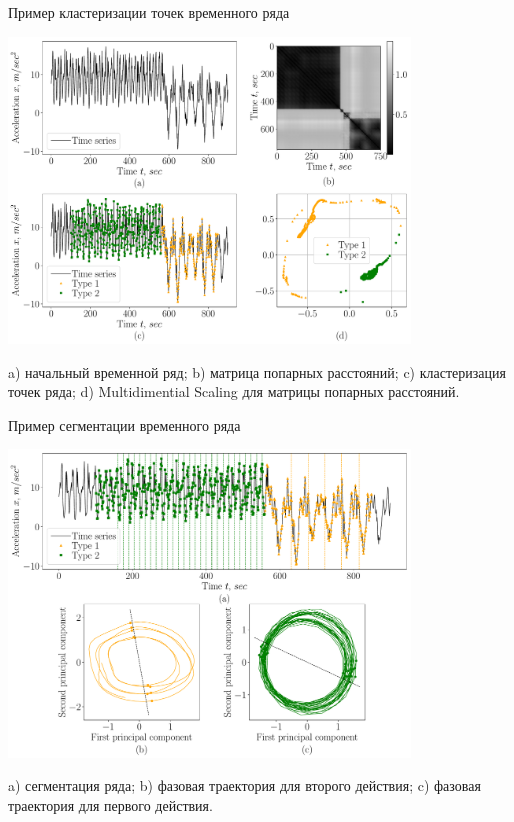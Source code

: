 \documentclass[9pt,pdf,hyperref={unicode}]{beamer}
\begin{document}
\begin{frame}{Пример кластеризации точек временного ряда}
\justifying

\begin{center}
	\includegraphics[width=0.8\textwidth]{results/experiment_clustering}
\end{center}

a) начальный временной ряд; b) матрица попарных расстояний; c) кластеризация точек ряда; d) Multidimential Scaling для матрицы попарных расстояний.
\end{frame}
\begin{frame}{Пример сегментации временного ряда}
\justifying
\begin{center}
	\includegraphics[width=0.8\textwidth]{results/experiment_segmentation}
\end{center}
a) сегментация ряда; b) фазовая траектория для второго действия; c) фазовая траектория для первого действия.

\end{frame}
\end{document}
